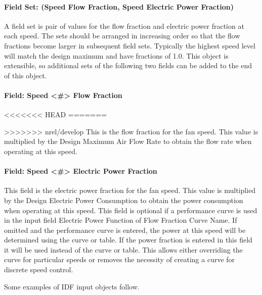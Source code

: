 \paragraph{Field Set: (Speed Flow Fraction, Speed Electric Power Fraction)}\label{fieldset-flow-power-fractions-fansysmodel}

A field set is pair of values for the flow fraction and electric power fraction at each speed. The sets should be arranged in increasing order so that the flow fractions become larger in subsequent field sets.  Typically the highest speed level will match the design maximum and have fractions of 1.0.  This object is extensible, so additional sets of the following two fields can be added to the end of this object.

\paragraph{Field: Speed <\#> Flow Fraction}\label{field-speed-flow-fraction-fansysmodel}
<<<<<<< HEAD
=======

>>>>>>> nrel/develop
This is the flow fraction for the fan speed. This value is multiplied by the Design Maximum Air Flow Rate to obtain the flow rate when operating at this speed.

\paragraph{Field: Speed <\#> Electric Power Fraction}\label{field-speed-power-fraction-fansysmodel}

This field is the electric power fraction for the fan speed. This value is multiplied by the Design Electric Power Consumption to obtain the power consumption when operating at this speed. This field is optional if a performance curve is used in the input field Electric Power Function of Flow Fraction Curve Name.  If omitted and the performance curve is entered, the power at this speed will be determined using the curve or table.  If the power fraction is entered in this field it will be used instead of the curve or table. This allows either overriding the curve for particular speeds or removes the necessity of creating a curve for discrete speed control.

Some examples of IDF input objects follow.

